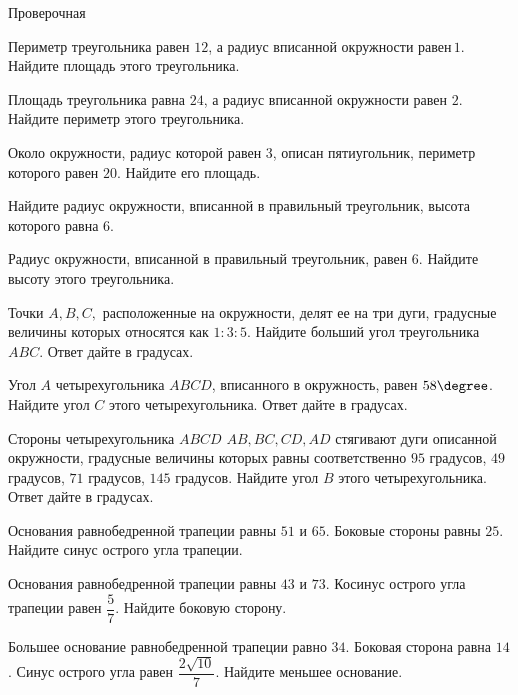 \begin{exam}
	\begin{listofex}
		\item Проверочная
	\end{listofex}
\end{exam}

\begin{consultation}
	\begin{listofex}
		\item Периметр треугольника равен \(12\), а радиус вписанной окружности равен \(1\). Найдите площадь этого треугольника.
		\item Площадь треугольника равна \(24\), а радиус вписанной окружности равен \(2\). Найдите периметр этого треугольника.
		\item Около окружности, радиус которой равен \(3\), описан пятиугольник, периметр которого равен \(20\). Найдите его площадь.
		\item Найдите радиус окружности, вписанной в правильный треугольник, высота которого равна \(6\).
		\item Радиус окружности, вписанной в правильный треугольник, равен \(6\). Найдите высоту этого треугольника.
		\item Точки \(A, B, C,\) расположенные на окружности, делят ее на три дуги, градусные величины которых относятся как \(1 : 3 : 5\). Найдите больший угол треугольника \(ABC\). Ответ дайте в градусах.
		\item Угол \(A\) четырехугольника \(ABCD\), вписанного в окружность, равен \(58\degree\). Найдите угол \(C\) этого четырехугольника. Ответ дайте в градусах.
		\item Стороны четырехугольника \(ABCD \) \( AB, BC, CD, AD\) стягивают дуги описанной окружности, градусные величины которых равны соответственно \(95\) градусов, \(49\) градусов, \(71\) градусов, \(145\) градусов. Найдите угол \(B\) этого четырехугольника. Ответ дайте в градусах.
		\item Основания равнобедренной трапеции равны \(51\) и \(65\). Боковые стороны равны \(25\). Найдите синус острого угла трапеции.
		\item Основания равнобедренной трапеции равны \(43\) и \(73\). Косинус острого угла трапеции равен \( \dfrac{5}{7} \).  Найдите боковую сторону.
		\item Большее основание равнобедренной трапеции равно \(34\). Боковая сторона равна \(14\). Синус острого угла равен \( \dfrac{2\sqrt{10}}{7} \). Найдите меньшее основание.

\end{listofex}
\end{consultation}
